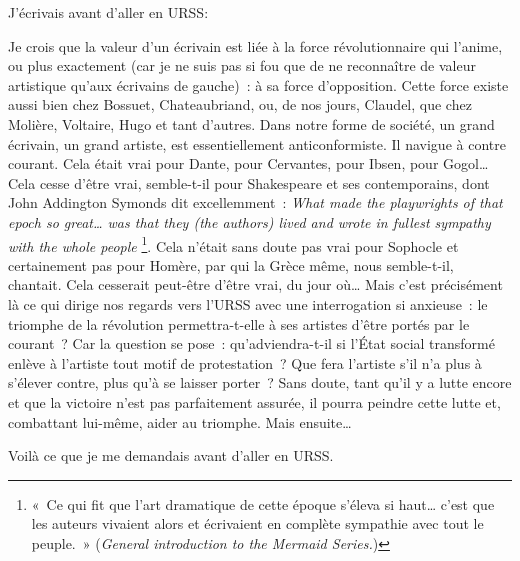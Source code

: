\documentclass[twoside]{book} %
\newcommand{\astermono}{\medskip\centerline{\color{rubric}\large\selectfont{\syms ✻}}\medskip\par}%
\newcommand\chaptercont{} %
\begin{document}
\chaptercont
\noindent J’écrivais avant d’aller en URSS:\par
Je crois que la valeur d’un écrivain est liée à la force révolutionnaire qui l’anime, ou plus exactement (car je ne suis pas si fou que de ne reconnaître de valeur artistique qu’aux écrivains de gauche) : à sa force d’opposition. Cette force existe aussi bien chez Bossuet, Chateaubriand, ou, de nos jours, Claudel, que chez Molière, Voltaire, Hugo et tant d’autres. Dans notre forme de société, un grand écrivain, un grand artiste, est essentiellement anticonformiste. Il navigue à contre courant. Cela était vrai pour Dante, pour Cervantes, pour Ibsen, pour Gogol… Cela cesse d’être vrai, semble-t-il pour Shakespeare et ses contemporains, dont John Addington Symonds dit excellemment : \emph{What made the playwrights of that epoch so great… was that they (the authors) lived and wrote in fullest sympathy with the whole people} \footnote{« Ce qui fit que l’art dramatique de cette époque s’éleva si haut… c’est que les auteurs vivaient alors et écrivaient en complète sympathie avec tout le peuple. » (\emph{General introduction to the Mermaid Series.})}. Cela n’était sans doute pas vrai pour Sophocle et certainement pas pour Homère, par qui la Grèce même, nous semble-t-il, chantait. Cela cesserait peut-être d’être vrai, du jour où… Mais c’est précisément là ce qui dirige nos regards vers l’URSS avec une interrogation si anxieuse : le triomphe de la révolution permettra-t-elle à ses artistes d’être portés par le courant ? Car la question se pose : qu’adviendra-t-il si l’État social transformé enlève à l’artiste tout motif de protestation ? Que fera l’artiste s’il n’a plus à s’élever contre, plus qu’à se laisser porter ? Sans doute, tant qu’il y a lutte encore et que la victoire n’est pas parfaitement assurée, il pourra peindre cette lutte et, combattant lui-même, aider au triomphe. Mais ensuite…\par
Voilà ce que je me demandais avant d’aller en URSS.\par

\astermono
\end{document}
